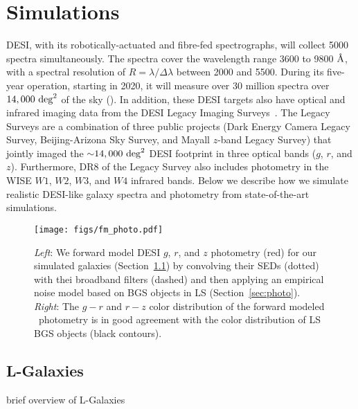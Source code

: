 \section{Simulations}\label{sec:sims}
DESI, with its robotically-actuated and fibre-fed spectrographs, will collect 5000 spectra simultaneously. The spectra
cover the wavelength range 3600 to 9800 $\AA$, with a spectral resolution of $R
= \lambda/\Delta \lambda$ between 2000 and 5500.
During its five-year operation, starting in 2020, it will measure over 30
million spectra over $14,000~{\rm deg}^2$ of the sky (). 
In addition, these DESI targets also have optical and infrared imaging data 
from the DESI Legacy Imaging Surveys~\citep[hereafter Legacy Surveys][]{dey2019}.
The Legacy Surveys are a combination of three public projects 
(Dark Energy Camera Legacy Survey, Beijing-Arizona Sky Survey, and Mayall 
$z$-band Legacy Survey) that jointly imaged the ${\sim}14,000~{\rm deg}^2$ DESI 
footprint in three optical bands ($g$, $r$, and $z$). Furthermore, DR8 of the
Legacy Survey also includes photometry in the WISE $W1$, $W2$, $W3$, and $W4$ 
infrared bands. 
Below we describe how we simulate realistic DESI-like galaxy spectra and photometry 
from state-of-the-art simulations.  


\begin{figure}
\begin{center}
\texttt{[image: figs/fm\_photo.pdf]}
\caption{{\em Left}: We forward model DESI $g$, $r$, and $z$ photometry (red)
    for our simulated galaxies (Section~\ref{sec:lgal}) by convolving their
    SEDs (dotted) with thei broadband filters (dashed) and then applying an 
    empirical noise model based on BGS objects in LS (Section~\ref{sec:photo}).
    {\em Right}: The $g-r$ and $r-z$ color distribution of the forward modeled
    \lgal~photometry is in good agreement with the color distribution of LS BGS
    objects (black contours).} \label{fig:photo}
\end{center}
\end{figure}

\subsection{L-Galaxies} \label{sec:lgal}
brief overview of {\sc L-Galaxies}~\citep[hereafter \lgal;][]{henriques2015}

